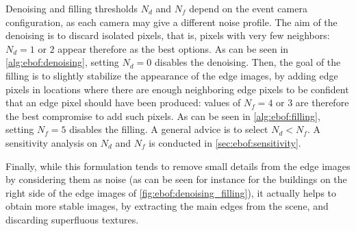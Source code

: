 Denoising and filling thresholds \(N_d\) and \(N_f\) depend on the event camera configuration, as each camera may give a different noise profile. The aim of the denoising is to discard isolated pixels, that is, pixels with very few neighbors: \(N_d = 1 \text{ or } 2\) appear therefore as the best options. As can be seen in \cref{alg:ebof:denoising}, setting \(N_d = 0\) disables the denoising. Then, the goal of the filling is to slightly stabilize the appearance of the edge images, by adding edge pixels in locations where there are enough neighboring edge pixels to be confident that an edge pixel should have been produced: values of \(N_f = 4 \text{ or } 3\) are therefore the best compromise to add such pixels. As can be seen in \cref{alg:ebof:filling}, setting \(N_f = 5\) disables the filling. A general advice is to select \(N_d < N_f\). A sensitivity analysis on \(N_d\) and \(N_f\) is conducted in \cref{sec:ebof:sensitivity}.

Finally, while this formulation tends to remove small details from the edge images by considering them as noise (as can be seen for instance for the buildings on the right side of the edge images of \cref{fig:ebof:denoising_filling}), it actually helps to obtain more stable images, by extracting the main edges from the scene, and discarding superfluous textures.

